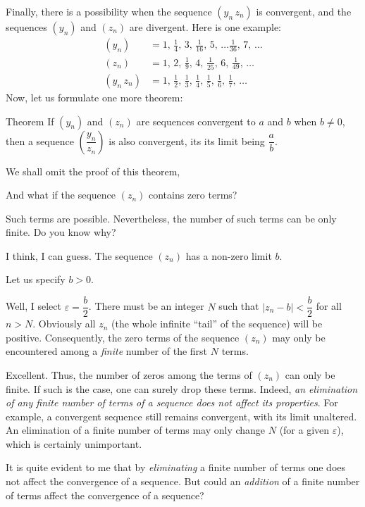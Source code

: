 {Finally, there is a possibility when the sequence $(y_{n} \, z_{n})$ is convergent, and the sequences $(y_{n})$ and $(z_{n})$ are divergent. Here is one example:
\begin{align*}%
(y_{n}) & = 1, \, \frac{1}{4}, \, 3, \, \frac{1}{16}, \, 5, \, \ldots \frac{1}{36}, \, 7, \, \ldots \\
(z_{n}) & =  1, \, 2, \, \frac{1}{9}, \, 4, \, \frac{1}{25}, \, 6, \, \frac{1}{49}, \, \ldots \\
(y_{n} \, z_{n}) & =   1, \, \frac{1}{2}, \, \frac{1}{3}, \, \frac{1}{4}, \, \frac{1}{5}, \, \frac{1}{6}, \, \frac{1}{7}, \, \ldots
\end{align*}
Now, let us formulate one more theorem: 
\begin{mytheo}{Theorem}
If $(y_{n})$ and $(z_{n})$ are sequences convergent to $a$ and $b$
when $b \neq 0$, then a sequence $\left(\dfrac{y_{n}}{z_{n}}\right)$ is also convergent, its its limit being $\dfrac{a}{b}$.
\end{mytheo}
We shall omit the proof of this theorem,

\rdr And what if the sequence $(z_{n})$ contains zero terms?

\athr Such terms are possible. Nevertheless, the number of such terms can be only finite. Do you know why? 

\rdr I think, I can guess. The sequence $(z_{n})$ has a non-zero limit $b$. 

\athr Let us specify $b > 0$.

\rdr Well, I select $\varepsilon = \dfrac{b}{2}$. There must be an integer $N$ such that $|z_{n} - b | < \dfrac{b}{2}$ for all $n > N$. Obviously all $z_{n}$ (the whole infinite ``tail'' of the sequence) will be positive. Consequently, the zero terms of the sequence $(z_{n})$ may only be encountered among a \emph{finite} number of the first $N$ terms. 

\athr Excellent. Thus, the number of zeros among the terms of $(z_{n})$ can only be finite. If such is the case, one can surely drop these terms. Indeed, \emph{an elimination of any finite number of terms of a sequence does not affect its properties}. For example, a convergent sequence still remains convergent, with its limit unaltered. An elimination of a finite number of terms may only change $N$ (for a given $\varepsilon$), which is certainly unimportant.

\rdr It is quite evident to me that by \emph{eliminating} a finite number of terms one does not affect the convergence of a sequence. But could an \emph{addition} of a finite number of terms affect the convergence of a sequence?

}
